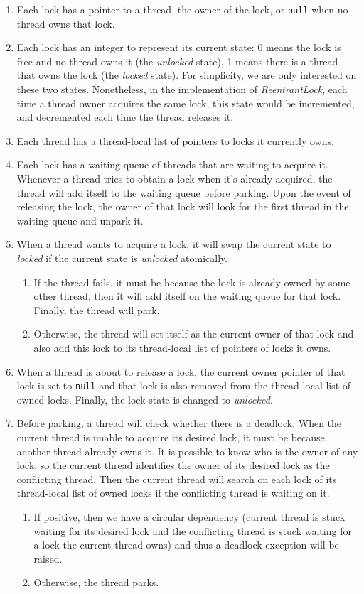 \begin{enumerate}
\item Each lock has a pointer to a thread, the owner of the lock, or {\tt null} when no thread owns that lock.
\item Each lock has an integer to represent its current state: 0 means the lock is free and no thread owns it (the \emph{unlocked} state), 1 means there is a thread that owns the lock (the \emph{locked} state). For simplicity, we are only interested on these two states. Nonetheless, in the implementation of \emph{ReentrantLock}, each time a thread owner acquires the same lock, this state would be incremented, and decremented each time the thread releases it.
\item Each thread has a thread-local list of pointers to locks it currently owns.
\item Each lock has a waiting queue of threads that are waiting to acquire it. Whenever a thread tries to obtain a lock when it's already acquired, the thread will add itself to the waiting queue before parking. Upon the event of releasing the lock, the owner of that lock will look for the first thread in the waiting queue and unpark it.
\item When a thread wants to acquire a lock, it will swap the current state to \emph{locked} if the current state is \emph{unlocked} atomically.
\begin{enumerate}
\item If the thread fails, it must be because the lock is already owned by some other thread, then it will add itself on the waiting queue for that lock. Finally, the thread will park.
\item Otherwise, the thread will set itself as the current owner of that lock and also add this lock to its thread-local list of pointers of locks it owns.
\end{enumerate}
\item When a thread is about to release a lock, the current owner pointer of that lock is set to {\tt null} and that lock is also removed from the thread-local list of owned locks. Finally, the lock state is changed to \emph{unlocked}.
\item Before parking, a thread will check whether there is a deadlock. When the current thread is unable to acquire its desired lock, it must be because another thread already owns it. It is possible to know who is the owner of any lock, so the current thread identifies the owner of its desired lock as the conflicting thread. Then the current thread will search on each lock of its thread-local list of owned locks if the conflicting thread is waiting on it.
\begin{enumerate}
\item If positive, then we have a circular dependency (current thread is stuck waiting for its desired lock and the conflicting thread is stuck waiting for a lock the current thread owns) and thus a deadlock exception will be raised.
\item Otherwise, the thread parks.
\end{enumerate}
\end{enumerate}

